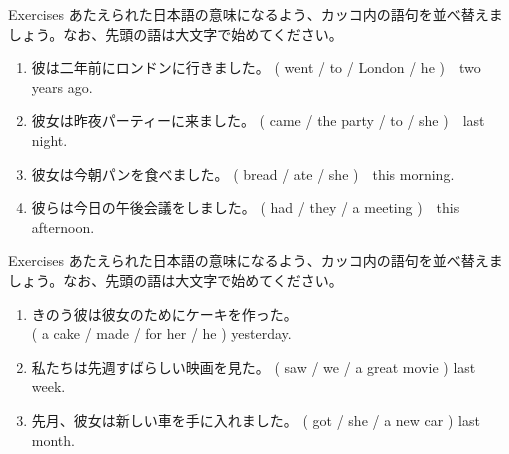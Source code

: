 \documentclass[aspectratio=169,xcolor={dvipsnames,table}]{beamer}
\newcommand{\myaudio}[1]{\href{#1}{\faVolumeUp}}
\begin{document}
\begin{frame}[plain]{Exercises}
あたえられた日本語の意味になるよう、カッコ内の語句を並べ替えましょう。なお、先頭の語は大文字で始めてください。 


\begin{enumerate}
 \item 彼は二年前にロンドンに行きました。
(  went / to / London / he )~~two years ago.\\
 \item 彼女は昨夜パーティーに来ました。\hspace{1\zw}
( came / the  party / to / she )~~last night.\\
 \item 彼女は今朝パンを食べました。\hspace{2.65\zw}
( bread / ate /  she  )~~this morning.\\
 \item 彼らは今日の午後会議をしました。\hspace{1\zw}
( had / they / a meeting )~~this afternoon.\\
\end{enumerate}
\hfill\myaudio{./audio/025_past_do_15.mp3}

\end{frame}


\begin{frame}[plain]{Exercises}
あたえられた日本語の意味になるよう、カッコ内の語句を並べ替えましょう。なお、先頭の語は大文字で始めてください。 


\begin{enumerate}
 \item きのう彼は彼女のためにケーキを作った。\\
\mbox{}\hfill{}( a cake / made / for her / he ) yesterday.\\
 \item 私たちは先週すばらしい映画を見た。
\hfill{}( saw / we / a great movie ) last week.\\
 \item 先月、彼女は新しい車を手に入れました。
( got / she / a new car ) last month.\\

\end{enumerate}
\hfill\myaudio{./audio/025_past_do_16.mp3}

\end{frame}
\end{document}
